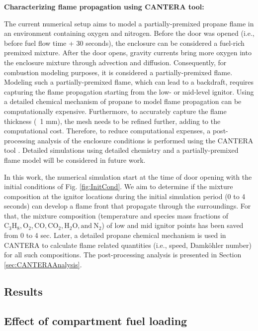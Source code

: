 \documentclass[12pt,letterpaper]{article}
\begin{document}
\begin{flushleft}
\textbf{ Characterizing flame propagation using CANTERA tool:}

The current numerical setup aims to model a partially-premixed propane flame in an environment containing oxygen and nitrogen. Before the door was opened (i.e., before fuel flow time + 30 seconds), the enclosure can be considered a fuel-rich premixed mixture. After the door opens, gravity currents bring more oxygen into the enclosure mixture through advection and diffusion. Consequently, for combustion modeling purposes, it is considered a partially-premixed flame. Modeling such a partially-premixed flame, which can lead to a backdraft, requires capturing the flame propagation starting from the low- or mid-level ignitor. Using a detailed chemical mechanism of propane to model flame propagation can be computationally expensive. Furthermore, to accurately capture the flame thickness (~1 mm), the mesh needs to be refined further, adding to the computational cost. Therefore, to reduce computational expenses, a post-processing analysis of the enclosure conditions is performed using the CANTERA tool \cite{cantera3}. Detailed simulations using detailed chemistry and a partially-premixed flame model will be considered in future work.

In this work, the numerical simulation start at the time of door opening with the initial conditions of Fig. \ref{fig:InitCond}. We aim to determine if the mixture composition at the ignitor locations during the initial simulation period (0 to 4 seconds) can develop a flame front that propagate through the surroundings. For that, the mixture composition (temperature and species mass fractions of $\mathrm{C_3H_8, O_2, CO, CO_2, H_2O, and \ N_2}$) of low and mid ignitor points has been saved from 0 to 4 sec. Later, a detailed propane chemical mechanism \cite{Qin2000} is used in CANTERA to calculate flame related quantities (i.e., speed, Damk\"{o}hler number) for all such compositions. The post-processing analysis is presented in Section \ref{sec:CANTERAAnalysis}. 


\subsection{Results} \addvspace{10pt}
\label{sec:results}

\subsection{Effect of compartment fuel loading}
\label{sec:resfuel}



\end{flushleft}
\end{document}

